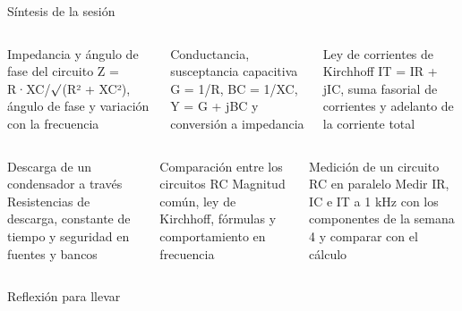 \documentclass[aspectratio=169,11pt,xcolor={table}]{beamer}
\begin{document}
\begin{frame}{Síntesis de la sesión}
\begin{columns}[T,onlytextwidth]
\begin{cardB}{Impedancia y ángulo de fase del circuito}
\scriptsize Z = R·XC/\ensuremath{\surd}(R² + XC²), ángulo de fase y variación con la frecuencia
\end{cardB}
\begin{cardO}{Conductancia, susceptancia capacitiva}
\scriptsize G = 1/R, BC = 1/XC, Y = G + jBC y conversión a impedancia
\end{cardO}
\begin{cardG}{Ley de corrientes de Kirchhoff}
\scriptsize IT = IR + jIC, suma fasorial de corrientes y adelanto de la corriente total
\end{cardG}
\end{columns}
\vspace{2mm}
\begin{columns}[T,onlytextwidth]
\begin{cardB}{Descarga de un condensador a través}
\scriptsize Resistencias de descarga, constante de tiempo y seguridad en fuentes y bancos
\end{cardB}
\begin{cardO}{Comparación entre los circuitos RC}
\scriptsize Magnitud común, ley de Kirchhoff, fórmulas y comportamiento en frecuencia
\end{cardO}
\begin{cardG}{Medición de un circuito RC en paralelo}
\scriptsize Medir IR, IC e IT a 1 kHz con los componentes de la semana 4 y comparar con el cálculo
\end{cardG}
\end{columns}
\end{frame}

\begin{frame}{Reflexión para llevar}
\centering
{}
\end{frame}
\end{document}
